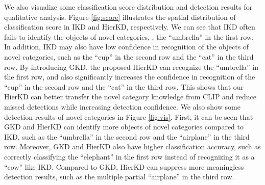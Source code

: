 \documentclass[10pt,twocolumn,letterpaper]{article}
\begin{document}
\begin{table}[]
\footnotesize
\centering
{}
\caption{Comparisons between different sampling strategies for negative samples. 1:1, 10\%, 100\% mean sampling the same number of negative samples as the positive samples, sampling 10 \% of the negative samples, and using all the negative samples.}
\label{tab: sample-abla}
\vspace{-1.4em}
\end{table}

We also visualize some classification score distribution and detection results for qualitative analysis. Figure \ref{fig:score} illustrates the spatial distribution of classification score in IKD and HierKD, respectively. We can see that IKD often fails to identify the objects of novel categories, \eg, the ``umbrella'' in the first row. In addition, IKD may also have low confidence in recognition of the objects of novel categories, such as the ``cup'' in the second row and the ``cat'' in the third row. By introducing GKD, the proposed HierKD can recognize the ``umbrella'' in the first row, and also significantly increases the confidence in recognition of the ``cup'' in the second row and the ``cat'' in the third row. This shows that our HierKD can better transfer the novel category knowledge from CLIP and reduce missed detections while increasing detection confidence. 
We also show some detection results of novel categories in Figure \ref{fig:vis}. First, it can be seen that GKD and HierKD can identify more objects of novel categories compared to IKD, such as the ``umbrella'' in the second row and the ``airplane'' in the third row. Moreover, GKD and HierKD also have higher classification accuracy, such as correctly classifying the ``elephant'' in the first row instead of recognizing it as a ``cow'' like IKD. Compared to GKD, HierKD can suppress more meaningless detection results, such as the multiple partial ``airplane'' in the third row. 
\end{document}
